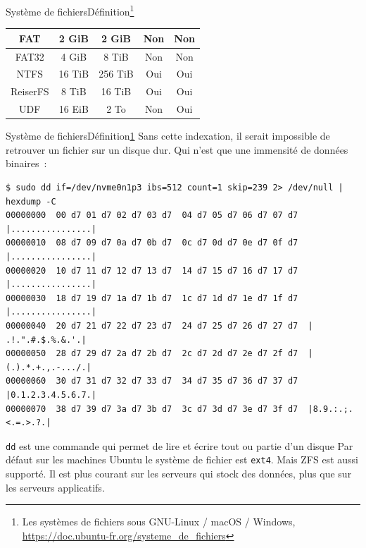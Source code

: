 \documentclass{beamer}
\begin{document}
\begin{frame}{Système de fichiers}{Définition\footnote{\label{fs}Les systèmes de fichiers sous GNU-Linux / macOS / Windows, \url{https://doc.ubuntu-fr.org/systeme_de_fichiers}}}
\begin{footnotesize}
\begin{table}[h!]
\begin{tabular}{|c|c|c|c|c|}
                    FAT          & 2 GiB                & 2 GiB                  & Non                 & Non                         \\ \hline
                    FAT32        & 4 GiB                & 8 TiB                  & Non                 & Non                         \\ \hline
                    NTFS         & 16 TiB               & 256 TiB                & Oui                 & Oui                         \\ \hline
                    ReiserFS     & 8 TiB                & 16 TiB                 & Oui                 & Oui                         \\ \hline
                    UDF          & 16 EiB               & 2 To                   & Non                 & Oui                         \\ \hline
                \end{tabular}
            \end{table}
        \end{footnotesize}
    \end{frame}

    \begin{frame}[fragile]{Système de fichiers}{Définition\cref{fs}}
        Sans cette indexation, il serait impossible de retrouver un fichier sur un disque dur.
        Qui n'est que une immensité de données binaires~:
        \begin{lstlisting}
$ sudo dd if=/dev/nvme0n1p3 ibs=512 count=1 skip=239 2> /dev/null | hexdump -C
00000000  00 d7 01 d7 02 d7 03 d7  04 d7 05 d7 06 d7 07 d7  |................|
00000010  08 d7 09 d7 0a d7 0b d7  0c d7 0d d7 0e d7 0f d7  |................|
00000020  10 d7 11 d7 12 d7 13 d7  14 d7 15 d7 16 d7 17 d7  |................|
00000030  18 d7 19 d7 1a d7 1b d7  1c d7 1d d7 1e d7 1f d7  |................|
00000040  20 d7 21 d7 22 d7 23 d7  24 d7 25 d7 26 d7 27 d7  | .!.".#.$.%.&.'.|
00000050  28 d7 29 d7 2a d7 2b d7  2c d7 2d d7 2e d7 2f d7  |(.).*.+.,.-.../.|
00000060  30 d7 31 d7 32 d7 33 d7  34 d7 35 d7 36 d7 37 d7  |0.1.2.3.4.5.6.7.|
00000070  38 d7 39 d7 3a d7 3b d7  3c d7 3d d7 3e d7 3f d7  |8.9.:.;.<.=.>.?.|
        \end{lstlisting}
        \lstinline{dd} est une commande qui permet de lire et écrire tout ou partie d'un disque
        \bigbreak
        Par défaut sur les machines Ubuntu le système de fichier est \lstinline{ext4}.
        \bigbreak
        Mais ZFS est aussi supporté.
        Il est plus courant sur les serveurs qui stock des données, plus que sur les serveurs applicatifs.
    \end{frame}
\end{document}
